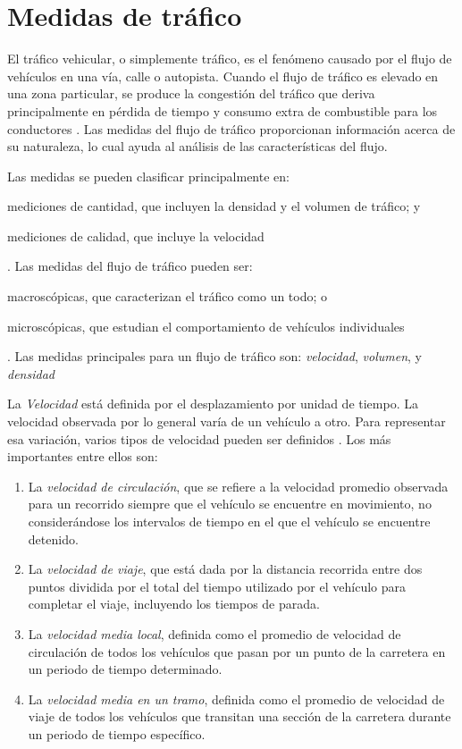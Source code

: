 \section{Medidas de tráfico}
\label{sec:medidas_trafico}

El tráfico vehicular, o simplemente tráfico, es el fenómeno causado por el flujo de vehículos en una vía, calle o autopista. Cuando el flujo de tráfico es elevado en una zona particular, se produce la congestión del tráfico que deriva principalmente en pérdida de tiempo y consumo extra de combustible para los conductores \cite{litman2011smart}. Las medidas del flujo de tráfico proporcionan información acerca de su naturaleza, lo cual ayuda al análisis de las características del flujo.

Las medidas se pueden clasificar principalmente en: \begin{enumerate*}[a)]
\item mediciones de cantidad, que incluyen la densidad y el volumen de tráfico; y \item mediciones de calidad, que incluye la velocidad
\end{enumerate*}. Las medidas del flujo de tráfico pueden ser: \begin{enumerate*}[a)] \item macroscópicas, que caracterizan el tráfico como un todo; o \item microscópicas, que estudian el comportamiento de vehículos individuales \end{enumerate*}. Las medidas principales para un flujo de tráfico son: \emph{velocidad}, \emph{volumen}, y \emph{densidad} \cite{may1990fundamentals}

La \emph{Velocidad} está definida por el desplazamiento por unidad de tiempo. La velocidad observada por lo general varía de un vehículo a otro. Para representar esa variación, varios tipos de velocidad pueden ser definidos \cite{may1990fundamentals}. Los más importantes entre ellos son: 
\begin{enumerate}

\item La \emph{velocidad de circulación}, que se refiere a la velocidad promedio observada para un recorrido siempre que el vehículo se encuentre en movimiento, no considerándose los intervalos de tiempo en el que el vehículo se encuentre detenido.

\item La \emph{velocidad de viaje}, que está dada por la distancia recorrida entre dos puntos dividida por el total del tiempo utilizado por el vehículo para completar el viaje, incluyendo los tiempos de parada.

\item La \emph{velocidad media local}, definida como el promedio de velocidad de circulación de todos los vehículos que pasan por un punto de la carretera en un periodo de tiempo determinado.

\item La \emph{velocidad media en un tramo}, definida como el promedio de velocidad de viaje de todos los vehículos que transitan una sección de la carretera durante un periodo de tiempo específico.
\end{enumerate}

